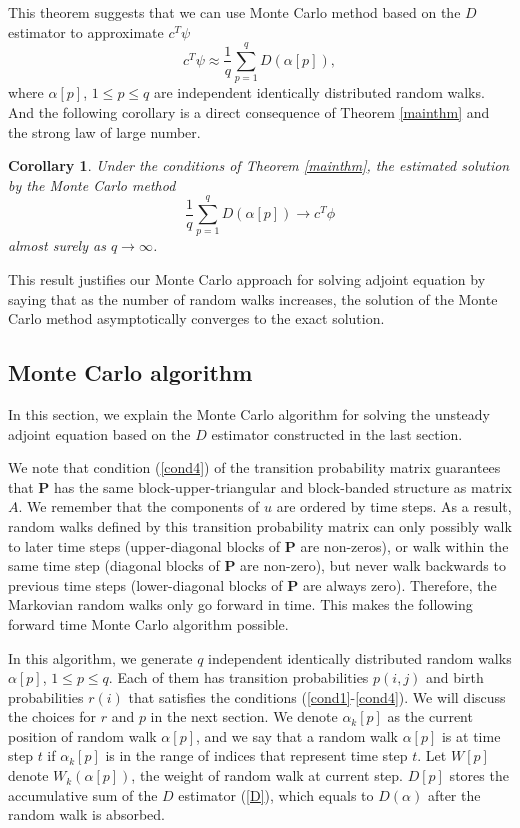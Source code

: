 \documentclass[a4paper,11pt]{article}
\newtheorem{corollary}[theorem]{Corollary}
\theoremstyle{remark}
\theoremstyle{definition}
\begin{document}
        This theorem suggests that we can use Monte Carlo method based on the
        $D$ estimator to approximate $c^T \psi$
        \[ c^T \psi \approx \frac1q \sum_{p=1}^q D(\alpha[p]), \]
        where $\alpha[p]$, $1\le p \le q$ are independent identically
        distributed random walks.  And the following corollary is a direct
        consequence of Theorem \ref{mainthm} and the strong law of large
        number.
        \begin{corollary}
            Under the conditions of Theorem \ref{mainthm}, the estimated
            solution by the Monte Carlo method
            \[ \frac1q \sum_{p=1}^q D(\alpha[p]) \to c^T \phi \]
            almost surely as $q\to\infty$.
        \end{corollary}
        This result justifies our Monte Carlo approach for solving adjoint
        equation by saying that as the number of random walks increases,
        the solution of the Monte Carlo method asymptotically converges to
        the exact solution.


    
    \subsection{Monte Carlo algorithm}
        In this section, we explain the Monte Carlo algorithm for solving the
        unsteady adjoint equation based on the $D$ estimator constructed in
        the last section.
        
        We note that condition (\ref{cond4}) of the transition probability
        matrix guarantees that $\mathbf{P}$ has the same block-upper-triangular
        and block-banded structure as matrix $A$. We remember that the
        components of $u$ are ordered by time steps. As a result, random
        walks defined by this transition probability matrix can only possibly
        walk to later time steps (upper-diagonal blocks of $\mathbf{P}$ are
        non-zeros), or walk within the same time step (diagonal blocks of
        $\mathbf{P}$ are non-zero), but never walk backwards to previous
        time steps (lower-diagonal blocks of $\mathbf{P}$ are always zero).
        Therefore, the Markovian random walks only go forward in time.
        This makes the following forward time Monte Carlo algorithm possible.
        
        In this algorithm, we generate $q$ independent identically
        distributed random walks $\alpha[p]$, $1\le p\le q$. Each of them
        has transition probabilities $p(i,j)$ and birth probabilities $r(i)$
        that satisfies the conditions (\ref{cond1}-\ref{cond4}). We will
        discuss the choices for $r$ and $p$ in the next section. We denote
        $\alpha_k[p]$ as the current position of random walk $\alpha[p]$,
        and we say that a random walk $\alpha[p]$ is at time step $t$ if
        $\alpha_k[p]$ is in the range of indices that represent time step
        $t$. Let $W[p]$ denote $W_k(\alpha[p])$, the weight of random walk
        at current step. $D[p]$ stores the accumulative sum of the $D$
        estimator (\ref{D}), which equals to $D(\alpha)$ after the random
        walk is absorbed.
        
\end{document}
